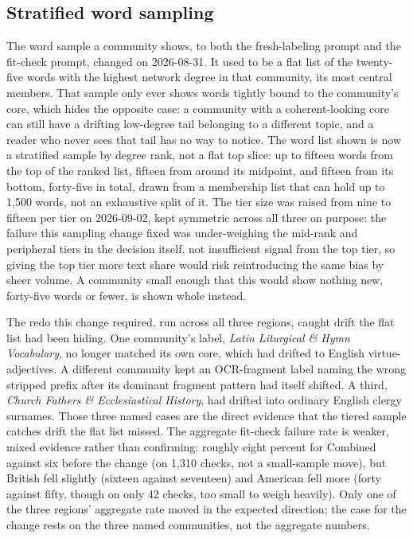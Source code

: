 \documentclass[11pt]{article}
\begin{document}
\subsection{Stratified word sampling}

The word sample a community shows, to both the fresh-labeling prompt and
the fit-check prompt, changed on 2026-08-31. It used to be a flat list
of the twenty-five words with the highest network degree in that
community, its most central members. That sample only ever shows words
tightly bound to the community's core, which hides the opposite case: a
community with a coherent-looking core can still have a drifting
low-degree tail belonging to a different topic, and a reader who never
sees that tail has no way to notice. The word list shown is now a
stratified sample by degree rank, not a flat top slice: up to fifteen
words from the top of the ranked list, fifteen from around its midpoint,
and fifteen from its bottom, forty-five in total, drawn from a
membership list that can hold up to 1{,}500 words, not an exhaustive
split of it. The tier size was raised from nine to fifteen per tier on
2026-09-02, kept symmetric across all three on purpose: the failure this
sampling change fixed was under-weighing the mid-rank and peripheral
tiers in the decision itself, not insufficient signal from the top tier,
so giving the top tier more text share would risk reintroducing the same
bias by sheer volume. A community small enough that this would show
nothing new, forty-five words or fewer, is shown whole instead.

The redo this change required, run across all three regions, caught
drift the flat list had been hiding. One community's label, \emph{Latin
Liturgical \& Hymn Vocabulary}, no longer matched its own core, which
had drifted to English virtue-adjectives. A different community kept an
OCR-fragment label naming the wrong stripped prefix after its dominant
fragment pattern had itself shifted. A third, \emph{Church Fathers \&
Ecclesiastical History}, had drifted into ordinary English clergy
surnames. Those three named cases are the direct evidence that the
tiered sample catches drift the flat list missed. The aggregate
fit-check failure rate is weaker, mixed evidence rather than confirming:
roughly eight percent for Combined against six before the change (on
1{,}310 checks, not a small-sample move), but British fell slightly
(sixteen against seventeen) and American fell more (forty against fifty,
though on only 42 checks, too small to weigh heavily). Only one of the
three regions' aggregate rate moved in the expected direction; the case
for the change rests on the three named communities, not the aggregate
numbers.
\end{document}
